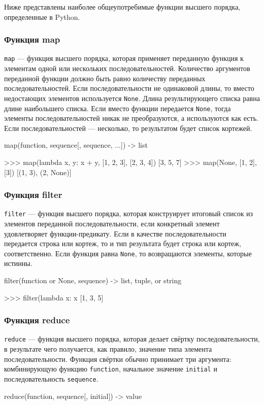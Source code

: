 Ниже представлены наиболее общеупотребимые функции высшего порядка, определенные в Python.

\subsubsection{Функция map}
\lstinline{map} --- функция высшего порядка, которая применяет переданную функция к элементам одной или нескольких последовательностей. Количество аргументов переданной функции должно быть равно количеству переданных последовательностей. Если последовательности не одинаковой длины, то вместо недостающих элементов используется \lstinline{None}. Длина результирующего списка равна длине наибольшего списка. Если вместо функции передается \lstinline{None}, тогда элементы последовательностей никак не преобразуются, а используются как есть. Если последовательностей --- несколько, то результатом будет список кортежей.
\begin{pylst}{}{}
map(function, sequence[, sequence, ...]) -> list

>>> map(lambda x, y: x + y, [1, 2, 3], [2, 3, 4])
[3, 5, 7]
>>> map(None, [1, 2], [3])
[(1, 3), (2, None)]
\end{pylst}

\subsubsection{Функция filter}
\lstinline{filter} --- функция высшего порядка, которая конструирует итоговый список из элементов переданной последовательности, если конкретный элемент удовлетворяет функции-предикату. Если в качестве последовательности передается строка или кортеж, то и тип результата будет строка или кортеж, соответственно. Если функция равна \lstinline{None}, то возвращаются элементы, которые истинны.
\begin{pylst}{}{}
filter(function or None, sequence) -> list, tuple, or string

>>> filter(lambda x: x %
[1, 3, 5]
\end{pylst}

\subsubsection{Функция reduce}
\lstinline{reduce} --- функция высшего порядка, которая делает свёртку последовательности, в результате чего получается, как правило, значение типа элемента последовательности. Функция свёртки обычно принимает три аргумента: комбинирующую функцию \lstinline{function}, начальное значение \lstinline{initial} и последовательность \lstinline{sequence}.
\begin{pylst}{}{}
reduce(function, sequence[, initial]) -> value
\end{pylst}

